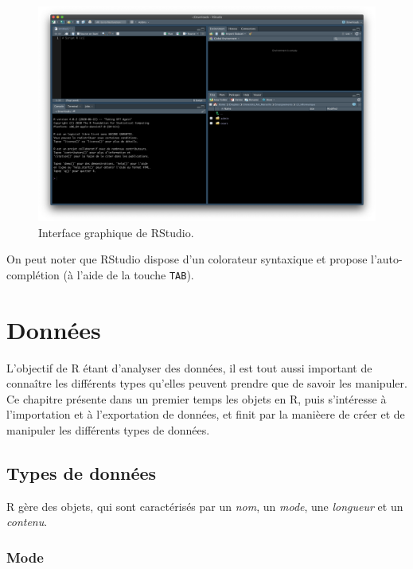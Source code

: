 \documentclass[
  11pt,
]{book}
\numberwithin{equation}{section}
\numberwithin{countremarque}{section}
\begin{document}
\begin{figure}[H]

{\centering \includegraphics[width=1\linewidth]{figs/rstudio} 

}

\caption{Interface graphique de RStudio.}\label{fig:intro-rstudio}
\end{figure}

On peut noter que RStudio dispose d'un colorateur syntaxique et propose l'auto-complétion (à l'aide de la touche \texttt{TAB}).

\hypertarget{donnuxe9es}{%
\chapter{Données}\label{donnuxe9es}}

L'objectif de R étant d'analyser des données, il est tout aussi important de connaître les différents types qu'elles peuvent prendre que de savoir les manipuler. Ce chapitre présente dans un premier temps les objets en R, puis s'intéresse à l'importation et à l'exportation de données, et finit par la manièere de créer et de manipuler les différents types de données.

\hypertarget{types-de-donnuxe9es}{%
\section{Types de données}\label{types-de-donnuxe9es}}

R gère des objets, qui sont caractérisés par un \emph{nom}, un \emph{mode}, une \emph{longueur} et un \emph{contenu}.

\hypertarget{donnees-mode}{%
\subsection{Mode}\label{donnees-mode}}
\end{document}
